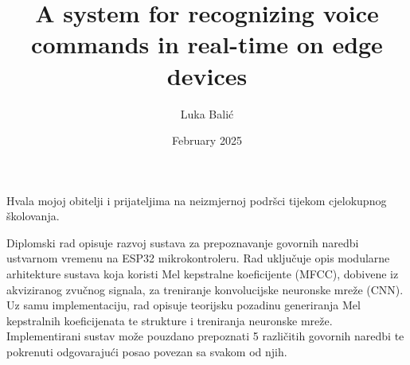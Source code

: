 \documentclass[diplomskirad, upload]{fer}
\title{A system for recognizing voice commands in real-time on edge devices}
\author{Luka Balić}
\date{February 2025}
\begin{document}
\maketitle






\begin{zahvale}
  Hvala mojoj obitelji i prijateljima na neizmjernoj podršci tijekom cjelokupnog školovanja.
\end{zahvale}


\mainmatter


\tableofcontents

%








\begingroup
\small

\endgroup



\begin{sazetak}
  Diplomski rad opisuje razvoj sustava za prepoznavanje govornih naredbi
  ustvarnom vremenu na ESP32 mikrokontroleru. Rad uključuje opis modularne
  arhitekture sustava koja koristi Mel kepstralne koeficijente (MFCC),
  dobivene iz akviziranog zvučnog signala, za treniranje konvolucijske
  neuronske mreže (CNN). Uz samu implementaciju, rad opisuje teorijsku
  pozadinu generiranja Mel kepstralnih koeficijenata te strukture i
  treniranja neuronske mreže. Implementirani sustav može pouzdano
  prepoznati 5 različitih govornih naredbi te pokrenuti odgovarajući
  posao povezan sa svakom od njih.
\end{sazetak}
\end{document}
